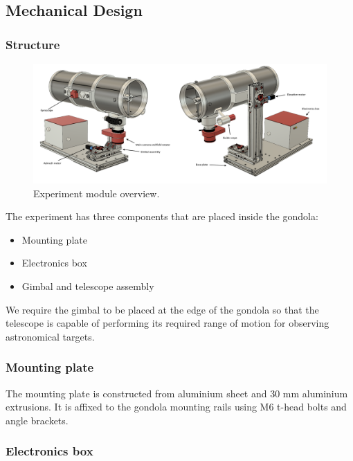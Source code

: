 \newpage
\subsection{Mechanical Design} \label{Mechanical_Design}
\label{sec:mechanical-design}

\subsubsection{Structure}

\begin{figure}[H]
	\centering 
	\includegraphics[scale=0.4]{4-experiment-design/img/mechanical/iso1.png}
	\caption{Experiment module overview.}
	\label{fig::mechanical::iso1}
\end{figure}

\label{sec:4.4.1}
The experiment has three components that are placed inside the gondola:
\begin{itemize}
  \item Mounting plate    
  \item Electronics box
  \item Gimbal and telescope assembly
\end{itemize}

We require the gimbal to be placed at the edge of the gondola so that the telescope is capable of performing its required range of motion for observing astronomical targets.



\subsubsection{Mounting plate}

The mounting plate is constructed from aluminium sheet and 30 mm aluminium extrusions. It is affixed to the gondola mounting rails using M6 t-head bolts and angle brackets. 

\subsubsection{Electronics box}
\label{sec:4.4.2}

